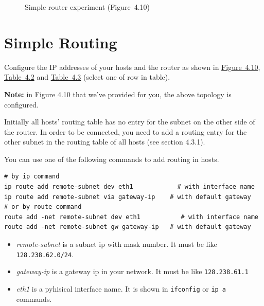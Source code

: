 \documentclass{UTNetLab}
\begin{document}
    \begin{figure}[H]
        \centering
        \caption{Simple router experiment (Figure~4.10)}\label{fig:4.10}
    \end{figure}

\section{Simple Routing}

    Configure the IP addresses of your hosts and the router as shown in \hyperref[fig:4.10]{Figure~4.10}, \hyperref[tab:4.2]{Table~4.2} and \hyperref[tab:4.3]{Table~4.3} (select one of row in table).
    
    \textbf{Note:} in Figure 4.10 that we've provided for you, the above topology is configured.

    Initially all hosts’ routing table has no entry for the subnet on the other side of the router.
    In order to be connected, you need to add a routing entry for the other subnet in the routing table of all hosts (see section 4.3.1).

    You can use one of the following commands to add routing in hosts.
    
    \begin{lstlisting}
# by ip command
ip route add remote-subnet dev eth1            # with interface name
ip route add remote-subnet via gateway-ip    # with default gateway
# or by route command
route add -net remote-subnet dev eth1           # with interface name
route add -net remote-subnet gw gateway-ip   # with default gateway
    \end{lstlisting}
    \begin{itemize}
        \item \textit{remote-subnet} is a subnet ip with mask number. It must be like \lstinline{128.238.62.0/24}.
        \item \textit{gateway-ip} is a gateway ip in your network. It must be like \lstinline{128.238.61.1}
        \item \textit{eth1} is a pyhisical interface name. It is shown in \lstinline{ifconfig} or \lstinline{ip a} commands.
    \end{itemize}
    
\end{document}
